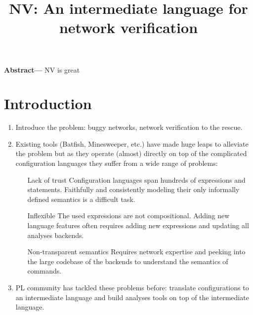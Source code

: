 \documentclass[sigconf,10pt]{acmart}
\begin{document}
\title{NV: An intermediate language for network verification}


\maketitle

%
%
%
%

\textbf{Abstract---}
NV is great

%
%
%
%

\section{Introduction} 
\label{sec:introduction}

\begin{enumerate}
  \item Introduce the problem: buggy networks, network verification to the rescue.
  \item Existing tools (Batfish, Minesweeper, etc.) have made huge leaps to alleviate the problem but as they operate (almost) directly on top of the complicated configuration languages they suffer from a wide range of problems:
    \begin{itemize}
      \item[Lack of trust] Configuration languages span hundreds of expressions and statements. Faithfully and consistently modeling their only informally defined semantics is a difficult task.
      \item[Inflexible] The used expressions are not compositional. Adding new language features often requires adding new expressions and updating all analyses backends.
      \item[Non-transparent semantics] Requires network expertise and peeking into the large codebase of the backends to understand the semantics of commands.
    \end{itemize}
  \item PL community has tackled these problems before: translate configurations to an intermediate language and build analyses tools on top of the intermediate language.
\end{enumerate}

%
%
%
%
\end{document}
